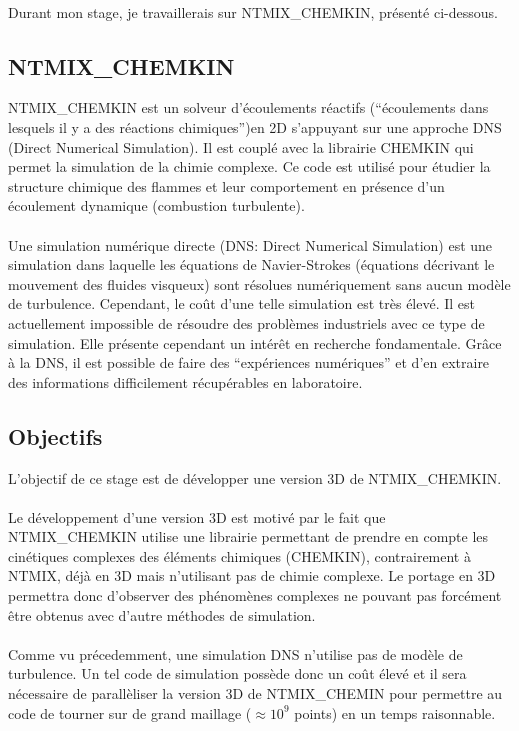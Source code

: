 \paragraph{}Durant mon stage, je travaillerais sur NTMIX\_CHEMKIN, présenté ci-dessous.


\subsection*{NTMIX\_CHEMKIN}
NTMIX\_CHEMKIN est un solveur d'écoulements réactifs (``écoulements dans lesquels il y a des réactions chimiques'')en 2D s'appuyant sur une approche DNS (Direct Numerical Simulation). Il est couplé avec la librairie CHEMKIN qui permet la simulation de la chimie complexe. Ce code est utilisé pour étudier la structure chimique des flammes et leur comportement en présence d'un écoulement dynamique (combustion turbulente).\cite{cerfacs}

\paragraph{}
Une simulation numérique directe (DNS: Direct Numerical Simulation) est une simulation dans laquelle les équations de Navier-Strokes (équations décrivant le mouvement des fluides visqueux) sont résolues numériquement sans aucun modèle de turbulence. Cependant, le coût d'une telle simulation est très élevé. Il est actuellement impossible de résoudre des problèmes industriels avec ce type de simulation. Elle présente cependant un intérêt en recherche fondamentale. Grâce à la DNS, il est possible de faire des ``expériences numériques''\cite{cfd-online-DNS} et d'en extraire des informations difficilement récupérables en laboratoire.


\subsection*{Objectifs}
L'objectif de ce stage est de développer une version 3D de NTMIX\_CHEMKIN.

\paragraph{}Le développement d'une version 3D est motivé par le fait que NTMIX\_CHEMKIN utilise une librairie permettant de prendre en compte les cinétiques complexes des éléments chimiques (CHEMKIN), contrairement à NTMIX, déjà en 3D mais n'utilisant pas de chimie complexe. Le portage en 3D permettra donc d'observer des phénomènes complexes ne pouvant pas forcément être obtenus avec d'autre méthodes de simulation.

\paragraph{}Comme vu précedemment, une simulation DNS n'utilise pas de modèle de turbulence. Un tel code de simulation possède donc un coût élevé et il sera nécessaire de parallèliser la version 3D de NTMIX\_CHEMIN pour permettre au code de tourner sur de grand maillage ($\approx 10^9$ points) en un temps raisonnable.
